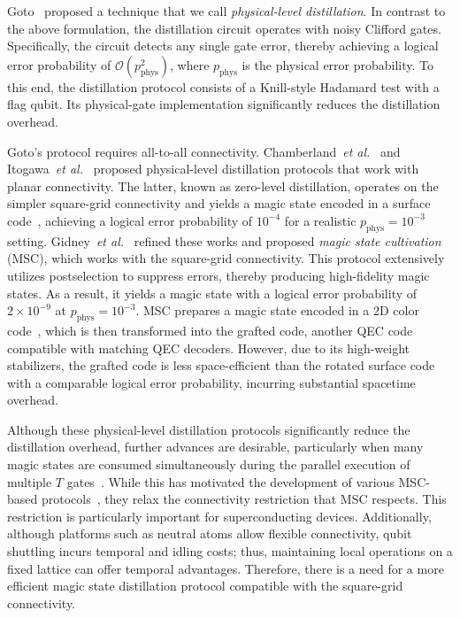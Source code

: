 Goto~\cite{Goto2016Minimizing} proposed a technique that we call \textit{physical-level distillation}.
In contrast to the above formulation, the distillation circuit operates with noisy Clifford gates.
Specifically, the circuit detects any single gate error, thereby achieving a logical error probability of $\mathcal{O}(p_\mathrm{phys}^2)$, where $p_\mathrm{phys}$ is the physical error probability.
To this end, the distillation protocol consists of a Knill-style Hadamard test with a flag qubit.
Its physical-gate implementation significantly reduces the distillation overhead.

Goto's protocol requires all-to-all connectivity.
Chamberland~\textit{et al.}~\cite{chamberland2020very} and Itogawa~\textit{et al.}~\cite{itogawa2025efficient} proposed physical-level distillation protocols that work with planar connectivity.
The latter, known as zero-level distillation, operates on the simpler square-grid connectivity and yields a magic state encoded in a surface code~\cite{Kitaev2003, bravyi2007measurement}, achieving a logical error probability of $10^{-4}$ for a realistic $p_\mathrm{phys} = 10^{-3}$ setting.
Gidney~\textit{et al.}~\cite{Gidney2024MagicStateCultivation} refined these works and proposed \textit{magic state cultivation} (MSC), which works with the square-grid connectivity.
This protocol extensively utilizes postselection to suppress errors, thereby producing high-fidelity magic states.
As a result, it yields a magic state with a logical error probability of $2 \times 10^{-9}$ at $p_\mathrm{phys} = 10^{-3}$.
MSC prepares a magic state encoded in a 2D color code~\cite{bombin2006topological}, which is then transformed into the grafted code, another QEC code compatible with matching QEC decoders.
However, due to its high-weight stabilizers, the grafted code is less space-efficient than the rotated surface code~\cite{bombin2007optimal} with a comparable logical error probability, incurring substantial spacetime overhead.

Although these physical-level distillation protocols significantly reduce the distillation overhead, further advances are desirable, particularly when many magic states are consumed simultaneously during the parallel execution of multiple $T$ gates~\cite{Beverland2022Assessing, hirano2025locality}.
While this has motivated the development of various MSC-based protocols~\cite{vaknin2025magic, chen2025efficient, sahay2025fold, claes2025cultivating}, they relax the connectivity restriction that MSC respects.
This restriction is particularly important for superconducting devices.
Additionally, although platforms such as neutral atoms allow flexible connectivity, qubit shuttling incurs temporal and idling costs; thus, maintaining local operations on a fixed lattice can offer temporal advantages.
Therefore, there is a need for a more efficient magic state distillation protocol compatible with the square-grid connectivity.

